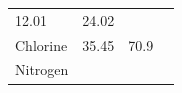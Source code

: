 \begin{enumerate}[noitemsep, label=\textbf{\arabic*}. ]
{{\begin{center}
\begin{tabular}[t]{|l|l|l|l|}
    
        12.01 &
    
    
        24.02 &
    
    
     \tabularnewline\cline{1-1}\cline{2-2}\cline{3-3}\cline{4-4}
    
    
        Chlorine &
    
    
        35.45 &
    
    
        70.9 &
    
    
     \tabularnewline\cline{1-1}\cline{2-2}\cline{3-3}\cline{4-4}
    
    
        Nitrogen &
    

\end{tabular}
\end{center}}}
\end{enumerate}
